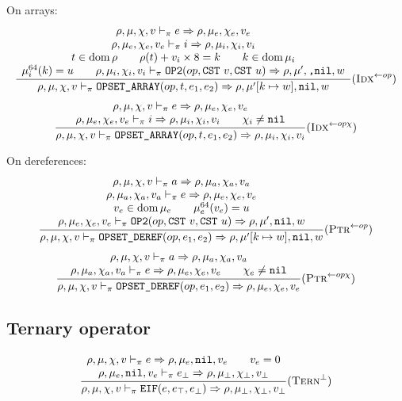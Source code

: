 On arrays:
\[\dfrac{\begin{array}{c}
    \rho,\mu,\chi,v \vdash_\pi e\Rightarrow \rho,\mu_e,\chi_e,v_e \\
    \rho,\mu_e,\chi_e,v_e \vdash_\pi i\Rightarrow \rho,\mu_i,\chi_i,v_i \\
    t\in\operatorname{dom}\rho \qquad \rho(t)+v_i\times8 = k \qquad k\in\operatorname{dom}\mu_i\\
    \mu_i^{64}(k) = u \qquad \rho,\mu_i,\chi_i,v_i \vdash_\pi \texttt{OP2}(op, \texttt{CST}\ v, \texttt{CST}\ u) \Rightarrow \rho,\mu',\texttt{,}\texttt{nil},w
\end{array}}{\rho,\mu,\chi,v \vdash_\pi \texttt{OPSET\_ARRAY}(op, t, e_1, e_2) \Rightarrow \rho,\mu'[k\mapsto w],\texttt{nil},w} (\textsc{Idx}^{\gets op})\]
\[\dfrac{\begin{array}{c}
    \rho,\mu,\chi,v \vdash_\pi e\Rightarrow \rho,\mu_e,\chi_e,v_e \\
    \rho,\mu_e,\chi_e,v_e \vdash_\pi i\Rightarrow \rho,\mu_i,\chi_i,v_i \qquad \chi_i\ne\texttt{nil}\\
\end{array}}{\rho,\mu,\chi,v \vdash_\pi \texttt{OPSET\_ARRAY}(op, t, e_1, e_2) \Rightarrow \rho,\mu_i,\chi_i,v_i} (\textsc{Idx}^{\gets op\chi})\]

On dereferences:
\[\dfrac{\begin{array}{c}
    \rho,\mu,\chi,v \vdash_\pi a\Rightarrow \rho,\mu_a,\chi_a,v_a \\
    \rho,\mu_a,\chi_a,v_a \vdash_\pi e\Rightarrow \rho,\mu_e,\chi_e,v_e \\
    v_e\in\operatorname{dom}\mu_e \qquad \mu_e^{64}(v_e) = u \\
    \rho,\mu_e,\chi_e,v_e \vdash_\pi \texttt{OP2}(op, \texttt{CST}\ v, \texttt{CST}\ u) \Rightarrow \rho,\mu',\texttt{nil},w
\end{array}}{\rho,\mu,\chi,v \vdash_\pi \texttt{OPSET\_DEREF}(op, e_1, e_2) \Rightarrow \rho,\mu'[k\mapsto w],\texttt{nil},w} (\textsc{Ptr}^{\gets op})\]
\[\dfrac{\begin{array}{c}
    \rho,\mu,\chi,v \vdash_\pi a\Rightarrow \rho,\mu_a,\chi_a,v_a \\
    \rho,\mu_a,\chi_a,v_a \vdash_\pi e\Rightarrow \rho,\mu_e,\chi_e,v_e \qquad \chi_e\ne\texttt{nil} \\
\end{array}}{\rho,\mu,\chi,v \vdash_\pi \texttt{OPSET\_DEREF}(op, e_1, e_2) \Rightarrow \rho,\mu_e,\chi_e,v_e} (\textsc{Ptr}^{\gets op\chi})\]

\subsection{Ternary operator}
\[\dfrac{\begin{array}{c}
    \rho,\mu,\chi,v \vdash_\pi e\Rightarrow \rho,\mu_e,\texttt{nil},v_e \qquad v_e = 0\\
    \rho,\mu_e,\texttt{nil},v_e \vdash_\pi e_\bot \Rightarrow \rho,\mu_\bot,\chi_\bot,v_\bot
\end{array}}{\rho,\mu,\chi,v \vdash_\pi \texttt{EIF}(e, e_\top, e_\bot) \Rightarrow \rho,\mu_\bot,\chi_\bot,v_\bot}(\textsc{Tern}^\bot)\]

